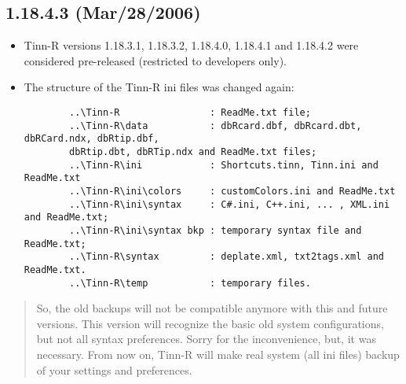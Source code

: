 \subsection*{1.18.4.3 (Mar/28/2006)}
\begin{itemize}
  \item Tinn-R versions 1.18.3.1, 1.18.3.2, 1.18.4.0, 1.18.4.1 and 1.18.4.2
    were considered pre-released (restricted to developers only).
  \item The structure of the Tinn-R ini files was changed again:

    \begin{footnotesize}
      \begin{verbatim}
        ..\Tinn-R                : ReadMe.txt file;
        ..\Tinn-R\data           : dbRcard.dbf, dbRcard.dbt, dbRCard.ndx, dbRtip.dbf,
        dbRtip.dbt, dbRTip.ndx and ReadMe.txt files;
        ..\Tinn-R\ini            : Shortcuts.tinn, Tinn.ini and ReadMe.txt
        ..\Tinn-R\ini\colors     : customColors.ini and ReadMe.txt
        ..\Tinn-R\ini\syntax     : C#.ini, C++.ini, ... , XML.ini and ReadMe.txt;
        ..\Tinn-R\ini\syntax bkp : temporary syntax file and ReadMe.txt;
        ..\Tinn-R\syntax         : deplate.xml, txt2tags.xml and ReadMe.txt.
        ..\Tinn-R\temp           : temporary files.
      \end{verbatim}
    \end{footnotesize}

\end{itemize}

\begin{footnotesize}
  \begin{quotation}
    So, the old backups will not be compatible anymore with this and future
    versions. This version will recognize the basic old system configurations,
    but not all syntax preferences. Sorry for the inconvenience, but, it was
    necessary. From now on, Tinn-R will make real system (all ini files)
    backup of your settings and preferences.
  \end{quotation}
\end{footnotesize}

